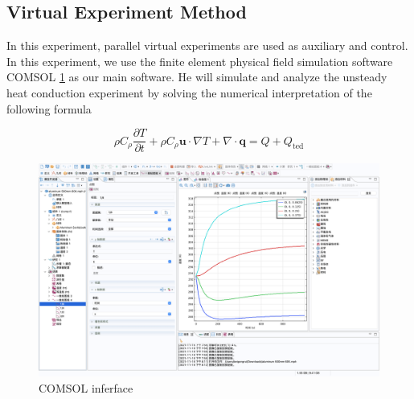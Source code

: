 \documentclass[12pt]{article}
\numberwithin{equation}{section}
\begin{document}
\subsection{Virtual Experiment Method}



In this experiment, parallel virtual experiments are used as auxiliary and control. In this experiment, we use the finite element physical field simulation software COMSOL \ref{COMSOL} as our main software. He will simulate and analyze the unsteady heat conduction experiment by solving the numerical interpretation of the following formula

\begin{equation}
	\rho C_{\rho} \frac{\partial T}{\partial t}+\rho C_{\rho} \mathbf{u} \cdot \nabla T+\nabla \cdot \mathbf{q}=Q+Q_{\mathrm{ted}}
\end{equation}

\begin{figure}%
\centering %
\includegraphics[width=1\textwidth]{COMSOLinterface.png} %
\caption{COMSOL inferface} %
\label{COMSOL} 
\end{figure} 
\end{document}
